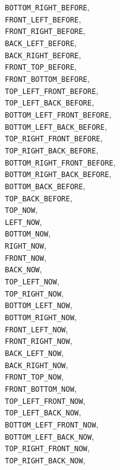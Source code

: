 \documentclass[10pt]{article}
\begin{document}
	\verb+BOTTOM_RIGHT_BEFORE+,\\
	\verb+FRONT_LEFT_BEFORE+,\\
	\verb+FRONT_RIGHT_BEFORE+,\\
	\verb+BACK_LEFT_BEFORE+,\\
	\verb+BACK_RIGHT_BEFORE+,\\
	\verb+FRONT_TOP_BEFORE+,\\
	\verb+FRONT_BOTTOM_BEFORE+,\\
	\verb+TOP_LEFT_FRONT_BEFORE+,\\
	\verb+TOP_LEFT_BACK_BEFORE+,\\
	\verb+BOTTOM_LEFT_FRONT_BEFORE+,\\
	\verb+BOTTOM_LEFT_BACK_BEFORE+,\\
	\verb+TOP_RIGHT_FRONT_BEFORE+,\\
	\verb+TOP_RIGHT_BACK_BEFORE+,\\
	\verb+BOTTOM_RIGHT_FRONT_BEFORE+,\\
	\verb+BOTTOM_RIGHT_BACK_BEFORE+,\\
	\verb+BOTTOM_BACK_BEFORE+,\\
	\verb+TOP_BACK_BEFORE+,	\\
	\verb+TOP_NOW+,\\
	\verb+LEFT_NOW+,\\
	\verb+BOTTOM_NOW+,\\
	\verb+RIGHT_NOW+,\\
	\verb+FRONT_NOW+,\\
	\verb+BACK_NOW+,\\
	\verb+TOP_LEFT_NOW+,\\
	\verb+TOP_RIGHT_NOW+,\\
	\verb+BOTTOM_LEFT_NOW+,\\
	\verb+BOTTOM_RIGHT_NOW+,\\
	\verb+FRONT_LEFT_NOW+,\\
	\verb+FRONT_RIGHT_NOW+,\\
	\verb+BACK_LEFT_NOW+,\\
	\verb+BACK_RIGHT_NOW+,\\
	\verb+FRONT_TOP_NOW+,\\
	\verb+FRONT_BOTTOM_NOW+,\\
	\verb+TOP_LEFT_FRONT_NOW+,\\
	\verb+TOP_LEFT_BACK_NOW+,\\
	\verb+BOTTOM_LEFT_FRONT_NOW+,\\
	\verb+BOTTOM_LEFT_BACK_NOW+,\\
	\verb+TOP_RIGHT_FRONT_NOW+,\\
	\verb+TOP_RIGHT_BACK_NOW+,\\
\end{document}
